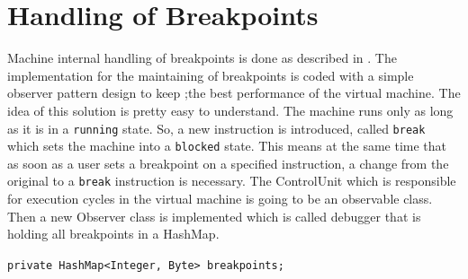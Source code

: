 \section{Handling of Breakpoints}
Machine internal handling of breakpoints is done as described in \cite{bendersky_how_nodate}. The implementation for the maintaining of breakpoints is coded with a simple observer pattern design to keep ;the best performance of the virtual machine. The idea of this solution is pretty easy to understand. The machine runs only as long as it is in a \lstinline$running$ state. So, a new instruction is introduced, called \lstinline$break$ which sets the machine into a \lstinline$blocked$ state. This means at the same time that as soon as a user sets a breakpoint on a specified instruction, a change from the original to a \lstinline$break$ instruction is necessary.
The ControlUnit which is responsible for execution cycles in the virtual machine is going to be an observable class. Then a new Observer class is implemented which is called debugger that is holding all breakpoints in a HashMap.

\lstinline$private HashMap<Integer, Byte> breakpoints;$
 
